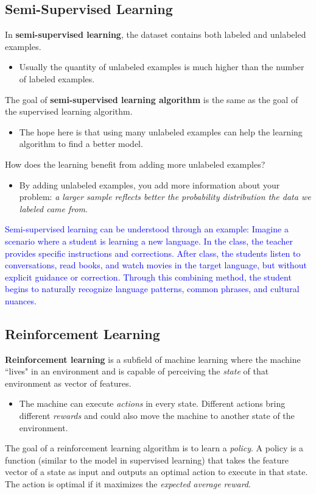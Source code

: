 \subsection{Semi-Supervised Learning}
In \textbf{semi-supervised learning}, the dataset contains both labeled and unlabeled examples.
\begin{itemize}
	\item Usually the quantity of unlabeled examples is much higher than the number of labeled examples.
\end{itemize}
The goal of \textbf{semi-supervised learning algorithm} is the same as the goal of the supervised learning algorithm.
\begin{itemize}
	\item The hope here is that using many unlabeled examples can help the learning algorithm to find a better model.
\end{itemize}
How does the learning benefit from adding more unlabeled examples?
\begin{itemize}
	\item By adding unlabeled examples, you add more information about your problem:\textit{ a larger sample reflects better the probability distribution the data we labeled came from}.
\end{itemize}

\textcolor{blue}{Semi-supervised learning can be understood through an example: Imagine a scenario where a student is learning a new language. In the class, the teacher provides specific instructions and corrections. After class, the students listen to conversations, read books, and watch movies in the target language, but without explicit guidance or correction. Through this combining method, the student begins to naturally recognize language patterns, common phrases, and cultural nuances.
}

\subsection{Reinforcement Learning}
\textbf{Reinforcement learning} is a subfield of machine learning where the machine ``lives" in an environment and is capable of perceiving the \textit{state} of that environment as vector of features.
\begin{itemize}
	\item The machine can execute \textit{actions} in every state. Different actions bring different \textit{rewards} and could also move the machine to another state of the environment.
\end{itemize}
The goal of a reinforcement learning algorithm is to learn a \textit{policy}. A policy is a function (similar to the model in supervised learning) that takes the feature vector of a state as input and outputs an optimal action to execute in that state. The action is optimal if it maximizes the \textit{expected average reward}.

